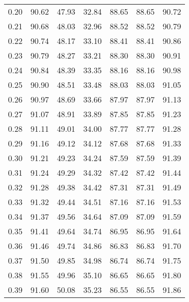 \begin{tabular}{|c|c|c|c|c|c|c|}
      0.20 &     90.62 &     47.93 &      32.84 &   88.65 &      88.65 &         90.72 \\
      0.21 &     90.68 &     48.03 &      32.96 &   88.52 &      88.52 &         90.79 \\
      0.22 &     90.74 &     48.17 &      33.10 &   88.41 &      88.41 &         90.86 \\
      0.23 &     90.79 &     48.27 &      33.21 &   88.30 &      88.30 &         90.91 \\
      0.24 &     90.84 &     48.39 &      33.35 &   88.16 &      88.16 &         90.98 \\
      0.25 &     90.90 &     48.51 &      33.48 &   88.03 &      88.03 &         91.05 \\
      0.26 &     90.97 &     48.69 &      33.66 &   87.97 &      87.97 &         91.13 \\
      0.27 &     91.07 &     48.91 &      33.89 &   87.85 &      87.85 &         91.23 \\
      0.28 &     91.11 &     49.01 &      34.00 &   87.77 &      87.77 &         91.28 \\
      0.29 &     91.16 &     49.12 &      34.12 &   87.68 &      87.68 &         91.33 \\
      0.30 &     91.21 &     49.23 &      34.24 &   87.59 &      87.59 &         91.39 \\
      0.31 &     91.24 &     49.29 &      34.32 &   87.42 &      87.42 &         91.44 \\
      0.32 &     91.28 &     49.38 &      34.42 &   87.31 &      87.31 &         91.49 \\
      0.33 &     91.32 &     49.44 &      34.51 &   87.16 &      87.16 &         91.53 \\
      0.34 &     91.37 &     49.56 &      34.64 &   87.09 &      87.09 &         91.59 \\
      0.35 &     91.41 &     49.64 &      34.74 &   86.95 &      86.95 &         91.64 \\
      0.36 &     91.46 &     49.74 &      34.86 &   86.83 &      86.83 &         91.70 \\
      0.37 &     91.50 &     49.85 &      34.98 &   86.74 &      86.74 &         91.75 \\
      0.38 &     91.55 &     49.96 &      35.10 &   86.65 &      86.65 &         91.80 \\
      0.39 &     91.60 &     50.08 &      35.23 &   86.55 &      86.55 &         91.86 \\

\end{tabular}
